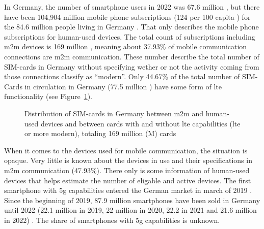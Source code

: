 \documentclass[11pt,a4paper]{article}
\begin{document}
In Germany, the number of smartphone users in 2022 was 67.6 million \citep{smartphonenutzerDeutschland}, but there have been 104,904 million mobile phone subscriptions (124 per 100 capita \citep{mobilesubscriptionsDeutschland}) for the 84.6 million people living in Germany \citep{consensusDE2022}.
That only describes the mobile phone subscriptions for human-used devices.
The total count of subscriptions including \acrshort{m2m} devices is 169 million \citep{totalmobilesubscriptionsDeutschland}, meaning about 37.93\% of mobile communication connections are \acrshort{m2m} communication.
These number describe the total number of SIM-cards in Germany without specifying wether or not the activity coming from those connections classify as \enquote{modern}.
Only 44.67\% of the total number of SIM-Cards in circulation in Germany (77.5 million \citep{simCardsDeutschland}) have some form of \acrshort{lte} functionality (see Figure~\ref{fig:simdistribution}).

\begin{figure}[h]


  \caption{Distribution of SIM-cards in Germany between \acrlong*{m2m} and human-used devices and between cards with and without \acrshort{lte} capabilities (\acrshort{lte} or more modern), totaling 169 million (M) cards}
  \label{fig:simdistribution}
\end{figure}

When it comes to the devices used for mobile communication, the situation is opaque.
Very little is known about the devices in use and their specifications in \acrshort{m2m} communication (47.93\%).
There only is some information of human-used devices that helps estimate the number of eligable and active devices.
The first smartphone with \acrshort{5g} capabilities entered the German market in march of 2019 \citep{smartphonemodells5G}.
Since the beginning of 2019, 87.9 million smartphones have been sold in Germany until 2022 (22.1 million in 2019, 22 million in 2020, 22.2 in 2021 and 21.6 million in 2022) \citep{smartphonenutzungDeutschland}.
The share of smartphones with \acrshort{5g} capabilities is unknown.
\end{document}
